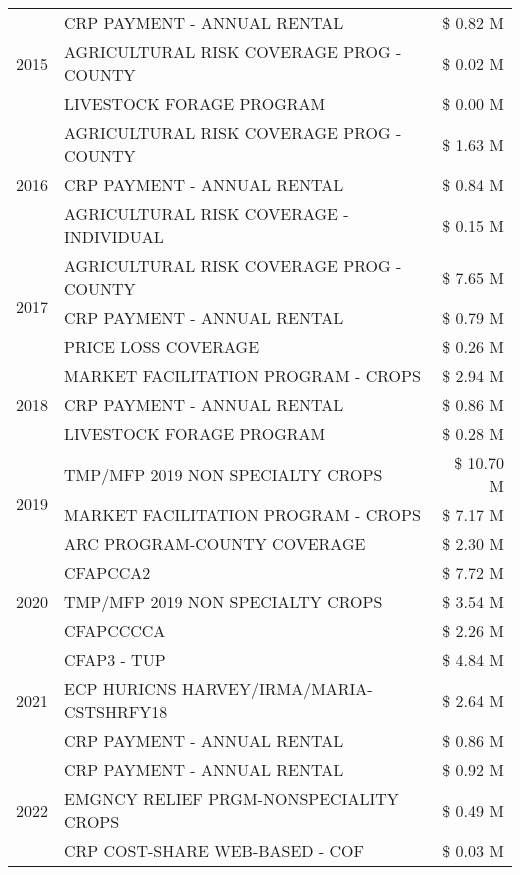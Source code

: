 \begin{tabular}{llr}
\cline{1-3}
\multirow[t]{3}{*}{2015} & CRP PAYMENT - ANNUAL RENTAL & \$ 0.82 M \\
 & AGRICULTURAL RISK COVERAGE PROG - COUNTY & \$ 0.02 M \\
 & LIVESTOCK FORAGE PROGRAM & \$ 0.00 M \\
\cline{1-3}
\multirow[t]{3}{*}{2016} & AGRICULTURAL RISK COVERAGE PROG - COUNTY & \$ 1.63 M \\
 & CRP PAYMENT - ANNUAL RENTAL & \$ 0.84 M \\
 & AGRICULTURAL RISK COVERAGE - INDIVIDUAL & \$ 0.15 M \\
\cline{1-3}
\multirow[t]{3}{*}{2017} & AGRICULTURAL RISK COVERAGE PROG - COUNTY & \$ 7.65 M \\
 & CRP PAYMENT - ANNUAL RENTAL & \$ 0.79 M \\
 & PRICE LOSS COVERAGE & \$ 0.26 M \\
\cline{1-3}
\multirow[t]{3}{*}{2018} & MARKET FACILITATION PROGRAM - CROPS & \$ 2.94 M \\
 & CRP PAYMENT - ANNUAL RENTAL & \$ 0.86 M \\
 & LIVESTOCK FORAGE PROGRAM & \$ 0.28 M \\
\cline{1-3}
\multirow[t]{3}{*}{2019} & TMP/MFP 2019 NON SPECIALTY CROPS & \$ 10.70 M \\
 & MARKET FACILITATION PROGRAM - CROPS & \$ 7.17 M \\
 & ARC PROGRAM-COUNTY COVERAGE & \$ 2.30 M \\
\cline{1-3}
\multirow[t]{3}{*}{2020} & CFAPCCA2 & \$ 7.72 M \\
 & TMP/MFP 2019 NON SPECIALTY CROPS & \$ 3.54 M \\
 & CFAPCCCCA & \$ 2.26 M \\
\cline{1-3}
\multirow[t]{3}{*}{2021} & CFAP3 - TUP & \$ 4.84 M \\
 & ECP HURICNS HARVEY/IRMA/MARIA-CSTSHRFY18 & \$ 2.64 M \\
 & CRP PAYMENT - ANNUAL RENTAL & \$ 0.86 M \\
\cline{1-3}
\multirow[t]{3}{*}{2022} & CRP PAYMENT - ANNUAL RENTAL & \$ 0.92 M \\
 & EMGNCY RELIEF PRGM-NONSPECIALITY CROPS & \$ 0.49 M \\
 & CRP COST-SHARE WEB-BASED - COF & \$ 0.03 M \\
\cline{1-3}
\bottomrule
\end{tabular}
